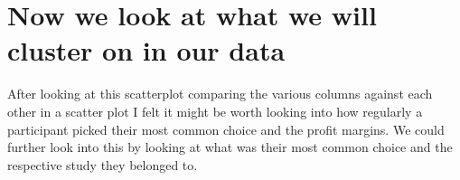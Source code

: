 \documentclass[letterpaper,10pt,english]{jupyterBook}
\begin{document}
\section{Now we look at what we will cluster on in our data}
\label{\detokenize{clustering:now-we-look-at-what-we-will-cluster-on-in-our-data}}
\begin{sphinxVerbatim}[commandchars=\\\{\}]
   
\end{sphinxVerbatim}

\noindent{}

\sphinxAtStartPar
After looking at this scatterplot comparing the various columns against each other in a scatter plot I felt it might be worth looking into how regularly a participant picked their most common choice and the profit margins. We could further look into this by looking at what was their most common choice and the respective study they belonged to.

\begin{sphinxVerbatim}[commandchars=\\\{\}]
  \PYG{p}{[}\PYG{p}{[} \PYG{p}{]}\PYG{p}{]}
  
\end{sphinxVerbatim}
\end{document}
